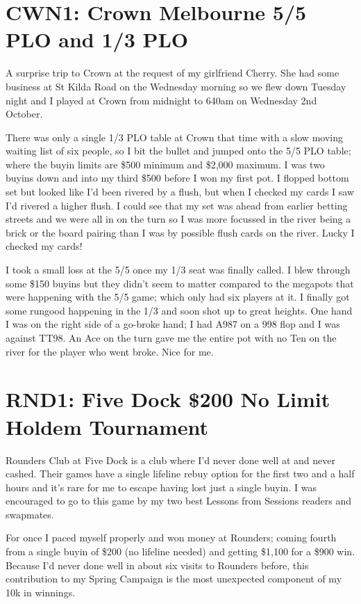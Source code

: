 \section*{CWN1: Crown Melbourne 5/5 PLO and 1/3 PLO}

A surprise trip to Crown at the request of my girlfriend Cherry. She
had some business at St Kilda Road on the Wednesday morning so we flew
down Tuesday night and I played at Crown from midnight to 640am on
Wednesday 2nd October.

There was only a single 1/3 PLO table at Crown that time with a slow
moving waiting list of six people, so I bit the bullet and jumped onto
the 5/5 PLO table; where the buyin limits are \$500 minimum and
\$2,000 maximum. I was two buyins down and into my third \$500 before
I won my first pot. I flopped bottom set but looked like I'd been
rivered by a flush, but when I checked my cards I saw I'd rivered a
higher flush. I could see that my set was ahead from earlier betting
streets and we were all in on the turn so I was more focussed in the
river being a brick or the board pairing than I was by possible flush
cards on the river. Lucky I checked my cards!

I took a small loss at the 5/5 once my 1/3 seat was finally called. I
blew through some \$150 buyins but they didn't seem to matter compared
to the megapots that were happening with the 5/5 game; which only had
six players at it. I finally got some rungood happening in the 1/3 and
soon shot up to great heights. One hand I was on the right side of a
go-broke hand; I had A987 on a 998 flop and I was against TT98. An Ace
on the turn gave me the entire pot with no Ten on the river for the
player who went broke. Nice for me.

\section*{RND1: Five Dock \$200 No Limit Holdem Tournament}

Rounders Club at Five Dock is a club where I'd never done well at and
never cashed. Their games have a single lifeline rebuy option for the
first two and a half hours and it's rare for me to escape having lost
just a single buyin. I was encouraged to go to this game by my two
best Lessons from Sessions readers and swapmates.

For once I paced myself properly and won money at Rounders; coming
fourth from a single buyin of \$200 (no lifeline needed) and getting
\$1,100 for a \$900 win. Because I'd never done well
in about six visits to Rounders before, this contribution to my Spring
Campaign is the most unexpected component of my 10k in winnings.

